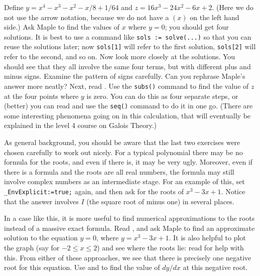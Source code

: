 \documentclass[a4paper,10pt]{amsbook}
\numberwithin{example}{chapter}
\begin{document}
\begin{exercise}\label{ex-biquadratic-roots}
  Define $y=x^4-x^3-x^2-x/8+1/64$ and $z=16x^3-24x^2-6x+2$.  (Here we
  do not use the arrow notation, because we do not have a $(x)$ on the
  left hand side.)  Ask Maple to find the values of $x$ where $y=0$;
  you should get four solutions.  It is best to use a command like
  \verb~sols := solve(...)~ so that you can reuse the solutions later;
  now \verb~sols[1]~ will refer to the first solution, \verb~sols[2]~
  will refer to the second, and so on.  Now look more closely at the
  solutions.  You should see that they all involve the same four
  terms, but with different plus and minus signs.  Examine the pattern
  of signs carefully.  Can you rephrase Maple's answer more neatly?
  Next, read \note{\NOTEsubs -- \NOTEsolvesubs}.  Use the
  \verb~subs()~ command to find the value of $z$ at the four points
  where $y$ is zero.  You can do this as four separate steps, or
  (better) you can read \note{\NOTEseq} and use the \verb~seq()~
  command to do it in one go.  (There are some interesting phenomena
  going on in this calculation, that will eventually be explained in
  the level 4 course on Galois Theory.)
\end{exercise}

\begin{exercise}\label{ex-cubic-horrid}
 As general background, you should be aware that the last two
 exercises were chosen carefully to work out nicely.  For a typical
 polynomial there may be no formula for the roots, and even if there
 is, it may be very ugly.  Moreover, even if there is a formula and
 the roots are all real numbers, the formula may still involve complex
 numbers as an intermediate stage.  For an example of this, set
 \verb~_EnvExplicit:=true;~ again, and then ask for the roots of
 $x^3-3x+1$.  Notice that the answer involves $I$ (the square root of
 minus one) in several places.

 In a case like this, it is more useful to find numerical
 approximations to the roots instead of a massive exact
 formula.  Read \note{\NOTEfsolve}, and ask Maple to find an
 approximate solution to the equation $y=0$, where $y=x^3-3x+1$.
 It is also helpful to plot the graph (say for $-2\leq x\leq 2$) and
 see where the roots lie: read \note{\NOTEbasicplot} for help with
 this.  From either of these approaches, we see that there is
 precisely one negative root for this equation.  Use \note{\NOTEdiff}
 and \note{\NOTEsubs} to find the value of $dy/dx$ at this negative
 root. 
\end{exercise}
\end{document}
